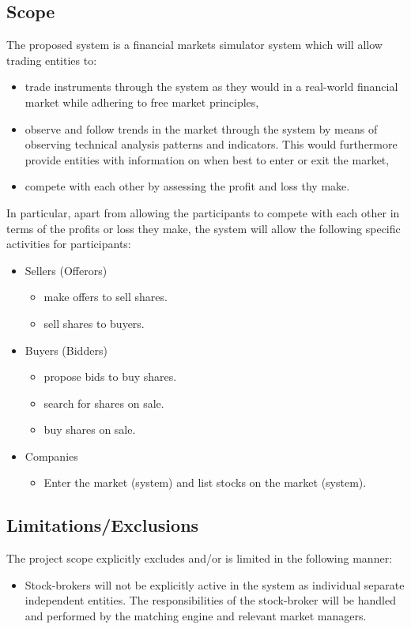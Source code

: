 \documentclass[12pt]{article}
\begin{document}
				\subsection{Scope}
				The proposed system is a financial markets simulator system which will allow trading entities to:
				\begin{itemize}
				\item trade instruments through the system as they would in a real-world financial market while adhering to free market principles,
				\item observe and follow trends in the market through the system by means of observing technical analysis patterns and indicators. This would furthermore provide entities with information on when best to enter or exit the market,
				\item compete with each other by assessing the profit and loss thy make.
				\end{itemize}
				
				In particular, apart from allowing the participants to compete with each other in terms of the profits or loss they make, the system will allow the following specific activities for participants:
				
				\begin{itemize}
				\item Sellers (Offerors)
					\begin{itemize}
					\item make offers to sell shares.
					\item sell shares to buyers.
					\end{itemize}
				\item Buyers (Bidders)
					\begin{itemize}
					\item propose bids to buy shares.
					\item search for shares on sale.
					\item buy shares on sale.
					\end{itemize}
				\item Companies
					\begin{itemize}
					\item Enter the market (system) and list stocks on the market (system).
					\end{itemize}
				
				\end{itemize}
				\subsection{Limitations/Exclusions}
				The project scope explicitly excludes and/or is limited in the following manner:
				\begin{itemize}
				\item Stock-brokers will not be explicitly active in the system as individual separate independent entities. The responsibilities of the stock-broker will be handled and performed by the matching engine and relevant market managers.
				\end{itemize}
					  
\end{document}
